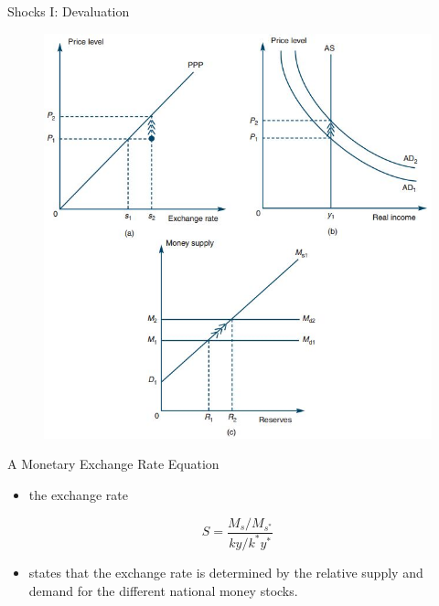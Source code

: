\documentclass[10pt,hyperref={CJKbookmarks=true},xcolor=dvipsnames,aspectratio=169]{beamer}
\begin{document}
\begin{frame}{Shocks I: Devaluation}


\begin{figure}


\includegraphics[scale=0.5]{fig/boptheory/lec08-19.JPG}
\end{figure}

\end{frame}

\begin{frame}{A Monetary Exchange Rate Equation}

\begin{itemize}
\item the exchange rate
\end{itemize}

\[
S=\frac{M_{s}/M_{s^{*}}}{ky/k^{*}y^{*}}
\]

\begin{itemize}
\item states that the exchange rate is determined by the relative supply
and demand for the different national money stocks. 
\end{itemize}
\end{frame}
\end{document}

